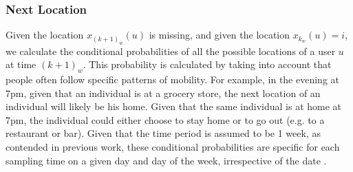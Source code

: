 \subsubsection{Next Location} 
%
%
Given the location $x_{{(k+1)}_w}(u)$ is missing, and given the location $x_{k_w}(u)=i$, we calculate the conditional probabilities of all the possible locations of a user $u$ at time $(k+1)_w$. This probability is calculated by taking into account that people often follow specific patterns of mobility. For example, in the evening at 7pm, given that an individual is at a grocery store, the next location of an individual will likely be his home. Given that the same individual is at home at 7pm, the individual could either choose to stay home or to go out (e.g. to a restaurant or bar). Given that the time period is assumed to be 1 week, as contended in previous work, these conditional probabilities are specific for each sampling time on a given day and day of the week, irrespective of the date \cite{56}. 
